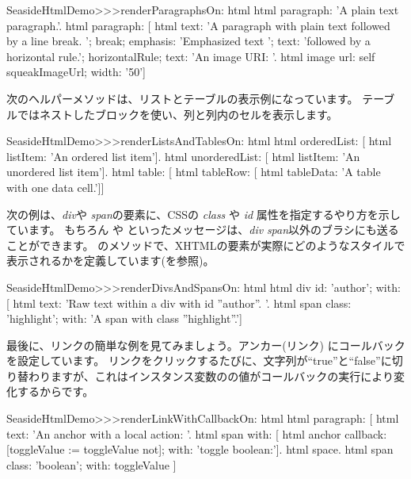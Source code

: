 \documentclass[a4paper,10pt,twoside]{book}
\begin{document}
\begin{code}{}
SeasideHtmlDemo>>>renderParagraphsOn: html 
	html paragraph: 'A plain text paragraph.'.
	html paragraph: [
		html
			text: 'A paragraph with plain text followed by a line break. ';
			break;
			emphasis: 'Emphasized text ';
			text: 'followed by a horizontal rule.';
			horizontalRule;
			text: 'An image URI: '.
		html image
			url: self squeakImageUrl;
			width: '50']
\end{code}

次のヘルパーメソッドは、リストとテーブルの表示例になっています。 
テーブルではネストしたブロックを使い、列と列内のセルを表示します。

\begin{code}{}
SeasideHtmlDemo>>>renderListsAndTablesOn: html 
	html orderedList: [
		html listItem: 'An ordered list item'].
	html unorderedList: [
		html listItem: 'An unordered list item'].
	html table: [
		html tableRow: [
			html tableData: 'A table with one data cell.']]
\end{code}

次の例は、\emph{div}や \emph{span}の要素に、CSSの \emph{class} や \emph{id} 属性を指定するやり方を示しています。
もちろん  や  といったメッセージは、\emph{div} \emph{span}以外のブラシにも送ることができます。
 のメソッドで、XHTMLの要素が実際にどのようなスタイルで表示されるかを定義しています(を参照)。

\begin{code}{}
SeasideHtmlDemo>>>renderDivsAndSpansOn: html 
	html div
		id: 'author';
		with: [
			html text: 'Raw text within a div with id ''author''. '.
			html span
				class: 'highlight';
				with: 'A span with class ''highlight''.']
\end{code}

最後に、リンクの簡単な例を見てみましょう。アンカー(リンク) にコールバックを設定しています。
リンクをクリックするたびに、文字列が``true''と``false''に切り替わりますが、これはインスタンス変数のの値がコールバックの実行により変化するからです。

\begin{code}{}
SeasideHtmlDemo>>>renderLinkWithCallbackOn: html 
	html paragraph: [
		html text: 'An anchor with a local action: '.
		html span with: [
			html anchor
				callback: [toggleValue := toggleValue not];
				with: 'toggle boolean:'].
		html space.
		html span
			class: 'boolean';
			with: toggleValue ]
\end{code}
\end{document}
